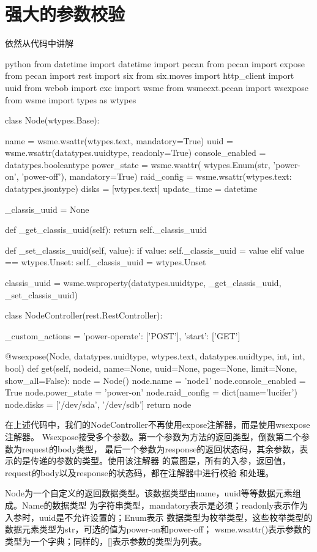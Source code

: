 \section{强大的参数校验}
依然从代码中讲解
\begin{code-block}{python}
from datetime import datetime
import pecan
from pecan import expose
from pecan import rest
import six
from six.moves import http_client
import uuid
from webob import exc
import wsme
from wsmeext.pecan import wsexpose
from wsme import types as wtypes


class Node(wtypes.Base):

    name = wsme.wsattr(wtypes.text, mandatory=True)
    uuid = wsme.wsattr(datatypes.uuidtype, readonly=True)
    console_enabled = datatypes.booleantype
    power_state = wsme.wsattr(
        wtypes.Enum(str, 'power-on', 'power-off'), mandatory=True)
    raid_config = wsme.wsattr({wtypes.text: datatypes.jsontype})
    disks = [wtypes.text]
    update_time = datetime

    _classis_uuid = None

    def _get_classis_uuid(self):
        return self._classis_uuid

    def _set_classis_uuid(self, value):
        if value:
            self._classis_uuid = value
        elif value == wtypes.Unset:
            self._classis_uuid = wtypes.Unset

    classis_uuid = wsme.wsproperty(datatypes.uuidtype, _get_classis_uuid,
                                   _set_classis_uuid)


class NodeController(rest.RestController):

    _custom_actions = {
        'power-operate': ['POST'],
        'start': ['GET']
    }

    @wsexpose(Node, datatypes.uuidtype, wtypes.text,
              datatypes.uuidtype, int, int, bool)
    def get(self, nodeid, name=None, uuid=None,
            page=None, limit=None, show_all=False):
        node = Node()
        node.name = 'node1'
        node.console_enabled = True
        node.power_state = 'power-on'
        node.raid_config = dict(name='lucifer')
        node.disks = ['/dev/sda', '/dev/sdb']
        return node
\end{code-block}

在上述代码中，我们的NodeController不再使用expose注解器，而是使用wsexpose注解器。
Wsexpose接受多个参数。第一个参数为方法的返回类型，倒数第二个参数为request的body类型，
最后一个参数为response的返回状态码，其余参数，表示的是传递的参数的类型。使用该注解器
的意图是，所有的入参，返回值，request的body以及response的状态码，都在注解器中进行校验
和处理。

Node为一个自定义的返回数据类型。该数据类型由name，uuid等等数据元素组成。Name的数据类型
为字符串类型，mandatory表示是必须；readonly表示作为入参时，uuid是不允许设置的；Enum表示
数据类型为枚举类型，这些枚举类型的数据元素类型为str，可选的值为power-on和power-off；
wsme.wsattr({})表示参数的类型为一个字典；同样的，[]表示参数的类型为列表。
